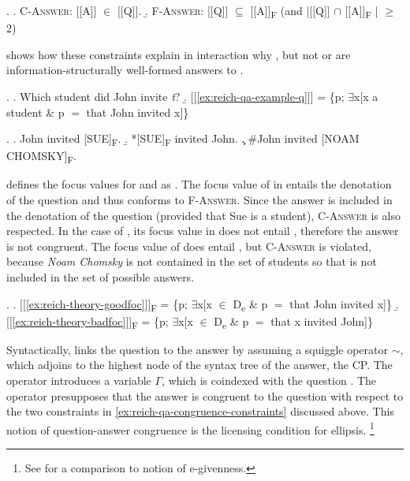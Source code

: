 \ex. \a. \textsc{C-Answer}: [[A]] $\in$ [[Q]].\label{ex:reich-qa-congruence-constraints}
\b. \textsc{F-Answer}: [[Q]] $\subseteq$ [[A]]\textsubscript{F} (and |[[Q]] $\cap$ [[A]]\textsubscript{F} | $\geq$ 2)

\citeauthor{reich2007} shows how these constraints explain in interaction why \NNext[a], but not \NNext[b] or \NNext[c] are information-structurally well-formed answers to \Next. 

\ex. \a. Which student did John invite \textit{t}? \hfill \citep[472]{reich2007} \label{ex:reich-qa-example-q}
\b. [[\ref{ex:reich-qa-example-q}]] = \{p; $\exists$x[x a student \& p $=$ that John invited x]\}

\ex. \a. John invited [SUE]\textsubscript{F}.\label{ex:reich-theory-goodfoc} \hfill\citep[472]{reich2007}
\b. *[SUE]\textsubscript{F} invited John. \label{ex:reich-theory-badfoc}
\c. \#John invited [NOAM CHOMSKY]\textsubscript{F}.  \label{ex:reich-theory-badfoc-full}

\citet[472]{reich2007} defines the focus values for \Last[a] and \Last[b] as \Next. The focus value of \Last[a] in \Next[a] entails the denotation of the question \LLast[b] and thus conforms to \textsc{F-Answer}. Since the answer is included in the denotation of the question (provided that Sue is a student), \textsc{C-Answer} is also respected. In the case of \Last[b], its focus value in \Next[b] does not entail \LLast[b], therefore the answer is not congruent. The focus value of \Last[c] does entail \LLast[b], but \textsc{C-Answer} is violated, because \textit{Noam Chomsky} is not contained in the set of students so that \Last[c] is not included in the set of possible answers.

\ex. \a. [[\ref{ex:reich-theory-goodfoc}]]\textsubscript{F} = \{p; $\exists$x[x $\in$ D\textsubscript{e} \& p $=$ that John invited x]\}
\b. [[\ref{ex:reich-theory-badfoc}]]\textsubscript{F} = \{p; $\exists$x[x $\in$ D\textsubscript{e} \& p $=$ that x invited John]\}

Syntactically, \citet[472]{reich2007} links the question to the answer by assuming a squiggle operator $\sim$, which adjoins to the highest node of the syntax tree of the answer, the CP. The operator introduces a variable $\Gamma$, which is coindexed with the question \Next. The operator presupposes that the answer is congruent to the question with respect to the two constraints in \ref{ex:reich-qa-congruence-constraints} discussed above. This notion of question-answer congruence is the licensing condition for ellipsis.%
%
\footnote{See \citet[474--477]{reich2007} for a comparison to  notion of e-givenness.}\afterfn%

